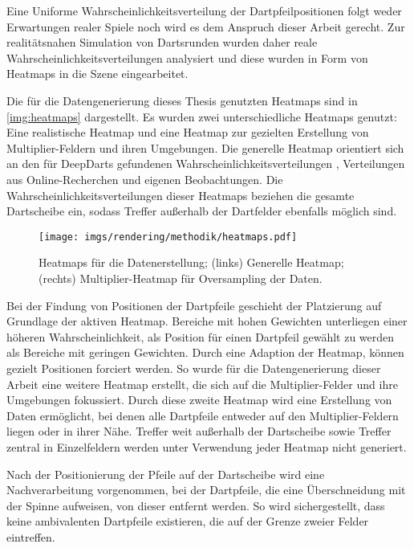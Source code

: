 Eine Uniforme Wahrscheinlichkeitsverteilung der Dartpfeilpositionen folgt weder Erwartungen realer Spiele noch wird es dem Anspruch dieser Arbeit gerecht. Zur realitätsnahen Simulation von Dartsrunden wurden daher reale Wahrscheinlichkeitsverteilungen analysiert und diese wurden in Form von Heatmaps in die Szene eingearbeitet.

Die für die Datengenerierung dieses Thesis genutzten Heatmaps sind in \autoref{img:heatmaps} dargestellt. Es wurden zwei unterschiedliche Heatmaps genutzt: Eine realistische Heatmap und eine Heatmap zur gezielten Erstellung von Multiplier-Feldern und ihren Umgebungen. Die generelle Heatmap orientiert sich an den für DeepDarts gefundenen Wahrscheinlichkeitsverteilungen \cite{deepdarts}, Verteilungen aus Online-Recherchen \cite{heatmap} und eigenen Beobachtungen. Die Wahrscheinlichkeitsverteilungen dieser Heatmaps beziehen die gesamte Dartscheibe ein, sodass Treffer außerhalb der Dartfelder ebenfalls möglich sind.

\begin{figure}
    \centering
    \texttt{[image: imgs/rendering/methodik/heatmaps.pdf]}
    \caption{Heatmaps für die Datenerstellung; (links) Generelle Heatmap; (rechts) Multiplier-Heatmap für Oversampling der Daten.}
    \label{img:heatmaps}
\end{figure}

Bei der Findung von Positionen der Dartpfeile geschieht der Platzierung auf Grundlage der aktiven Heatmap. Bereiche mit hohen Gewichten unterliegen einer höheren Wahrscheinlichkeit, als Position für einen Dartpfeil gewählt zu werden als Bereiche mit geringen Gewichten. Durch eine Adaption der Heatmap, können gezielt Positionen forciert werden. So wurde für die Datengenerierung dieser Arbeit eine weitere Heatmap erstellt, die sich auf die Multiplier-Felder und ihre Umgebungen fokussiert. Durch diese zweite Heatmap wird eine Erstellung von Daten ermöglicht, bei denen alle Dartpfeile entweder auf den Multiplier-Feldern liegen oder in ihrer Nähe. Treffer weit außerhalb der Dartscheibe sowie Treffer zentral in Einzelfeldern werden unter Verwendung jeder Heatmap nicht generiert.

Nach der Positionierung der Pfeile auf der Dartscheibe wird eine Nachverarbeitung vorgenommen, bei der Dartpfeile, die eine Überschneidung mit der Spinne aufweisen, von dieser entfernt werden. So wird sichergestellt, dass keine ambivalenten Dartpfeile existieren, die auf der Grenze zweier Felder eintreffen.

